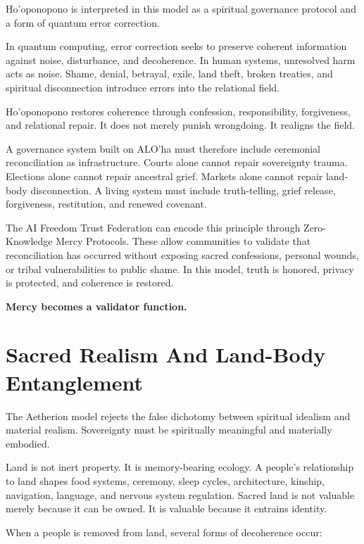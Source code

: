 \documentclass[12pt]{article}
\begin{document}
Ho'oponopono is interpreted in this model as a spiritual governance protocol and a form of quantum error correction.

In quantum computing, error correction seeks to preserve coherent information against noise, disturbance, and decoherence. In human systems, unresolved harm acts as noise. Shame, denial, betrayal, exile, land theft, broken treaties, and spiritual disconnection introduce errors into the relational field.

Ho'oponopono restores coherence through confession, responsibility, forgiveness, and relational repair. It does not merely punish wrongdoing. It realigns the field.

A governance system built on ALO'ha must therefore include ceremonial reconciliation as infrastructure. Courts alone cannot repair sovereignty trauma. Elections alone cannot repair ancestral grief. Markets alone cannot repair land-body disconnection. A living system must include truth-telling, grief release, forgiveness, restitution, and renewed covenant.

The AI Freedom Trust Federation can encode this principle through Zero-Knowledge Mercy Protocols. These allow communities to validate that reconciliation has occurred without exposing sacred confessions, personal wounds, or tribal vulnerabilities to public shame. In this model, truth is honored, privacy is protected, and coherence is restored.

\begin{center}
\textbf{Mercy becomes a validator function.}
\end{center}

\section{Sacred Realism And Land-Body Entanglement}

The Aetherion model rejects the false dichotomy between spiritual idealism and material realism. Sovereignty must be spiritually meaningful and materially embodied.

Land is not inert property. It is memory-bearing ecology. A people's relationship to land shapes food systems, ceremony, sleep cycles, architecture, kinship, navigation, language, and nervous system regulation. Sacred land is not valuable merely because it can be owned. It is valuable because it entrains identity.

When a people is removed from land, several forms of decoherence occur:
\end{document}
